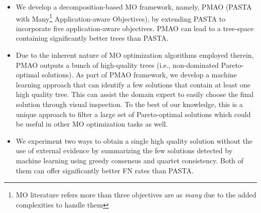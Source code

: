 \begin{itemize}
	\item We develop a decomposition-based MO framework, namely, PMAO (PASTA with Many\footnote{ MO literature refers more than three objectives are as \textit{many}\cite{li2015many} due to the added complexities to handle them} Application-aware Objectives), by extending PASTA to incorporate five application-aware objectives. PMAO can lead to a tree-space containing significantly better trees than PASTA. 

	\item Due to the inherent nature of MO optimization algorithms employed therein, PMAO outputs a bunch of high-quality trees (i.e., non-dominated Pareto-optimal solutions). As part of PMAO framework, we develop a machine learning approach that can identify a few solutions that contain at least one high quality tree. This can assist the domain expert to easily choose the final solution through visual inspection. To the best of our knowledge, this is a unique approach to filter a large set of Pareto-optimal solutions which could be useful in other MO optimization tasks as well. 
	
	\item We experiment two ways to obtain a single high quality solution without the use of external evidence by summarizing the few solutions detected by machine learning using greedy consensus and quartet consistency. Both of them can offer significantly better FN rates than PASTA.

\end{itemize}

